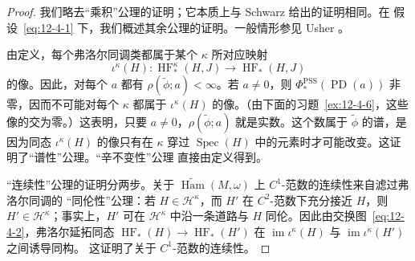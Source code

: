 \begin{proof}
我们略去“乘积”公理的证明；它本质上与 Schwarz  给出的证明相同。在
假设~\eqref{eq:12-4-1} 下，我们概述其余公理的证明。一般情形参见 Usher
。

由定义，每个弗洛尔同调类都属于某个 $\kappa$ 所对应映射
\[
  \iota^\kappa(H):\operatorname{HF}_*^\kappa(H,J)
  \longrightarrow\operatorname{HF}_*(H,J)
\]
的像。因此，对每个 $a$ 都有 $\rho(\widetilde\phi;a)<\infty$。若 $a\ne0$，则
$\Phi_*^{\mathrm{PSS}}(\operatorname{PD}(a))$ 非零，因而不可能对每个 $\kappa$ 都属于
$\iota^\kappa(H)$ 的像。（由下面的习题~\ref{ex:12-4-6}，这些像的交为零。）这表明，只要
$a\ne0$，$\rho(\widetilde\phi;a)$ 就是实数。这个数属于
$\widetilde\phi$ 的谱，是因为同态 $\iota^\kappa(H)$ 的像只有在 $\kappa$ 穿过
$\operatorname{Spec}(H)$ 中的元素时才可能改变。这证明了“谱性”公理。“辛不变性”公理
直接由定义得到。

“连续性”公理的证明分两步。关于
$\widetilde{\operatorname{Ham}}(M,\omega)$ 上 $C^1$-范数的连续性来自滤过弗洛尔同调的
“同伦性”公理：若 $H\in\mathcal H^\kappa$，而 $H'$ 在 $C^2$-范数下充分接近 $H$，则
$H'\in\mathcal H^\kappa$；事实上，$H'$ 可在 $\mathcal H^\kappa$ 中沿一条道路与 $H$
同伦。因此由交换图~\eqref{eq:12-4-2}，弗洛尔延拓同态
$\operatorname{HF}_*(H)\to\operatorname{HF}_*(H')$ 在
$\operatorname{im}\iota^\kappa(H)$ 与 $\operatorname{im}\iota^\kappa(H')$ 之间诱导同构。
这证明了关于 $C^1$-范数的连续性。


\end{proof}
